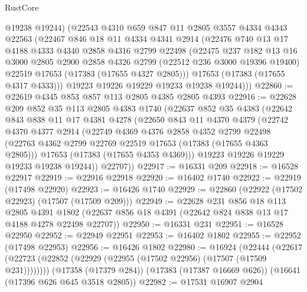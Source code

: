 \begin{lexlean}{RustCore}
\begin{coremodule}
        @19238
        @19244)
      (@22543
        @4310
        @659
        @847
        @11
        @2805
        @3557
        @4334
        @4343
        @22563
        (@22467
          @846
          @18
          @11
          @4334
          @4341
          @2914
          (@22476
            @740
            @13
            @17
            @4188
            @4333
            @4340
            @2858
            @4316
            @2799
            @22498
            (@22475
              @237
              @182
              @13
              @16
              @3000
              @2805
              @2900
              @2858
              @4326
              @2799
              (@22512 @236 @3000 @19396 @19400)
              @22519
              @17653
              (@17383 (@17655 @4327 @2805)))
            @17653
            (@17383 (@17655 @4317 @4333)))
          @19223
          @19226
          @19229
          @19233
          @19238
          @19244)))
@22860 := @22619 @4345 @853 @857 @113 @2805 @4385 @2805 @4393
@22916 := @22628
    @209
    @852
    @35
    @113
    @2805
    @4383
    @1740
    (@22637
      @852
      @35
      @4383
      (@22642
        @843
        @838
        @11
        @17
        @4381
        @4278
        (@22650
          @843
          @11
          @4370
          @4379
          (@22742
            @4370
            @4377
            @2914
            (@22749
              @4369
              @4376
              @2858
              @4352
              @2799
              @22498
              (@22763 @4362 @2799 @22769 @22519 @17653 (@17383 (@17655 @4363 @2805)))
              @17653
              (@17383 (@17655 @4353 @4369)))
            @19223
            @19226
            @19229
            @19233
            @19238
            @19244))
        @22707))
@22917 := @16331 @209
@22918 := @16528 @22917
@22919 := @22916 @22918
@22920 := @16402 @1740
@22922 := @22919 (@17498 @22920)
@22923 := @16426 @1740
@22929 := @22860 (@22922 (@17502 @22923) (@17507 (@17509 @209)))
@22949 := @22628
    @231
    @856
    @18
    @113
    @2805
    @4391
    @1802
    (@22637 @856 @18 @4391 (@22642 @824 @838 @13 @17 @4188 @4278 @22498 @22707))
@22950 := @16331 @231
@22951 := @16528 @22950
@22952 := @22949 @22951
@22953 := @16402 @1802
@22955 := @22952 (@17498 @22953)
@22956 := @16426 @1802
@22980 := @16924
    (@22444 (@22617 (@22723 (@22852 (@22929 (@22955 (@17502 @22956) (@17507 (@17509 @231))))))))
    (@17358 (@17379 @284))
    (@17383 (@17387 @16669 @626))
    (@16641 (@17396 @626 @645 @3518 @2805))
@22982 := @17531 @16907 @2904

\end{coremodule}
\end{lexlean}
